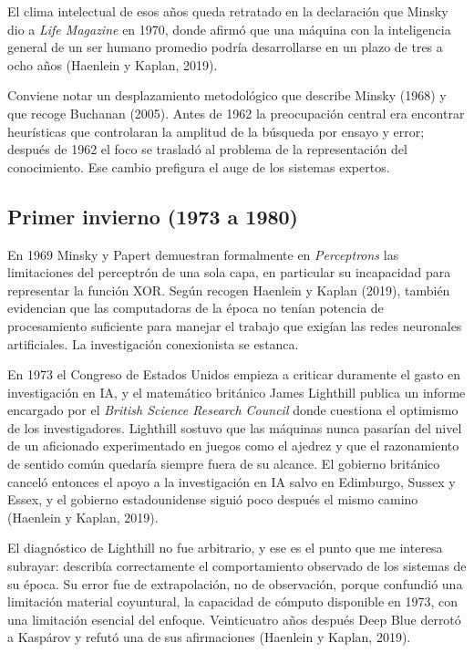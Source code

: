 \documentclass[12pt,letterpaper,oneside]{article}
\begin{document}
El clima intelectual de esos años queda retratado en la declaración que Minsky dio a \textit{Life Magazine} en 1970, donde afirmó que una máquina con la inteligencia general de un ser humano promedio podría desarrollarse en un plazo de tres a ocho años (Haenlein y Kaplan, 2019).

Conviene notar un desplazamiento metodológico que describe Minsky (1968) y que recoge Buchanan (2005). Antes de 1962 la preocupación central era encontrar heurísticas que controlaran la amplitud de la búsqueda por ensayo y error; después de 1962 el foco se trasladó al problema de la representación del conocimiento. Ese cambio prefigura el auge de los sistemas expertos.

\subsection{Primer invierno (1973 a 1980)}

En 1969 Minsky y Papert demuestran formalmente en \textit{Perceptrons} las limitaciones del perceptrón de una sola capa, en particular su incapacidad para representar la función XOR. Según recogen Haenlein y Kaplan (2019), también evidencian que las computadoras de la época no tenían potencia de procesamiento suficiente para manejar el trabajo que exigían las redes neuronales artificiales. La investigación conexionista se estanca.

En 1973 el Congreso de Estados Unidos empieza a criticar duramente el gasto en investigación en IA, y el matemático británico James Lighthill publica un informe encargado por el \textit{British Science Research Council} donde cuestiona el optimismo de los investigadores. Lighthill sostuvo que las máquinas nunca pasarían del nivel de un aficionado experimentado en juegos como el ajedrez y que el razonamiento de sentido común quedaría siempre fuera de su alcance. El gobierno británico canceló entonces el apoyo a la investigación en IA salvo en Edimburgo, Sussex y Essex, y el gobierno estadounidense siguió poco después el mismo camino (Haenlein y Kaplan, 2019).

El diagnóstico de Lighthill no fue arbitrario, y ese es el punto que me interesa subrayar: describía correctamente el comportamiento observado de los sistemas de su época. Su error fue de extrapolación, no de observación, porque confundió una limitación material coyuntural, la capacidad de cómputo disponible en 1973, con una limitación esencial del enfoque. Veinticuatro años después Deep Blue derrotó a Kaspárov y refutó una de sus afirmaciones (Haenlein y Kaplan, 2019).
\end{document}
